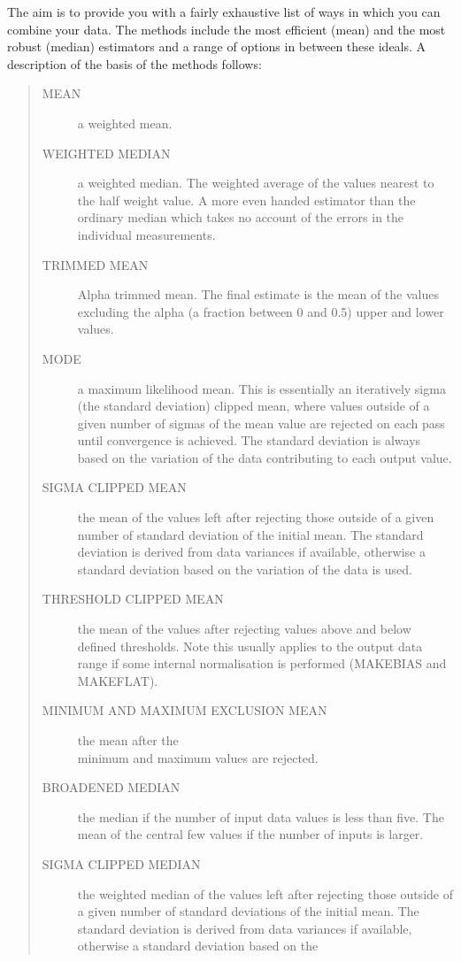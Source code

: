 \documentclass[twoside,11pt]{article}
\newcommand{\htmlref}[2]{#1}
\newcommand{\latexhtml}[2]{#1}
\renewcommand{\_}{\texttt{\symbol{95}}}
\newcommand{\ttsize}{\latexhtml{\small}{}}
\newenvironment{myquote}{\begin{quote}\ttsize}{\end{quote}}
\newcommand{\xroutine}[1]{\htmlref{{\sc #1}}{#1}}
\begin{document}
The aim is to provide you with a fairly exhaustive list of ways in which
you can combine your data. The methods include the most efficient
(mean) and the most robust (median) estimators and a range of options
in between these ideals. A description of the basis of the methods
follows:
\begin{myquote}
\begin{description}
\item[MEAN] a weighted mean.
\item[WEIGHTED MEDIAN] a weighted median. The weighted average of the
values nearest to the half weight value. A more even handed estimator
than the ordinary median which takes no account of the errors in the
individual measurements.
\item[TRIMMED MEAN] Alpha trimmed mean. The final estimate is the mean of the
values excluding the alpha (a fraction between 0 and 0.5) upper and lower
values.
\item[MODE] a maximum likelihood mean. This is essentially an
iteratively sigma (the standard deviation) clipped mean, where values
outside of a given number of sigmas of the mean value are rejected on
each pass until convergence is achieved. The standard deviation is always
based on the variation of the data contributing to each output value.
\item[SIGMA CLIPPED MEAN]  the mean of the values left after rejecting those
outside of a given number of standard deviation of the initial mean. The
standard deviation is derived from data variances if available, otherwise
a standard deviation based on the variation of the data is used.
\item[THRESHOLD CLIPPED MEAN] the mean of the values after rejecting
values above and below defined thresholds. Note this usually applies to
the output data range if some internal normalisation is performed
(\xroutine{MAKEBIAS} and
\xroutine{MAKEFLAT}).
\item[MINIMUM AND MAXIMUM EXCLUSION MEAN] the mean after the \\ minimum and
maximum values are rejected.
\item[BROADENED MEDIAN] the median if the number of input data values is
less than five. The mean of the central few values if the number of inputs is
larger.
\item[SIGMA CLIPPED MEDIAN]  the weighted median of the values left
after rejecting those outside of a given number of standard deviations
of the initial mean. The standard deviation is derived from data
variances if available, otherwise a standard deviation based on the

\end{description}
\end{myquote}
\end{document}
